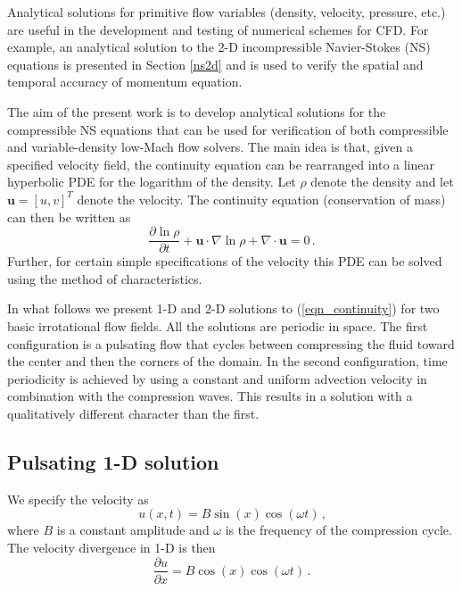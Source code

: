 \documentclass[11pt]{book}
\begin{document}
Analytical solutions for primitive flow variables (density, velocity, pressure, etc.) are useful in the development and testing of numerical schemes for CFD.  For example, an analytical solution to the 2-D incompressible Navier-Stokes (NS) equations is presented in Section \ref{ns2d} and is used to verify the spatial and temporal accuracy of momentum equation.

The aim of the present work is to develop analytical solutions for the compressible NS equations that can be used for verification of both compressible and variable-density low-Mach flow solvers.  The main idea is that, given a specified velocity field, the continuity equation can be rearranged into a linear hyperbolic PDE for the logarithm of the density.  Let $\rho$ denote the density and let $\mathbf{u} = [u,v]^T$ denote the velocity. The continuity equation (conservation of mass) can then be written as
\begin{equation}
\label{eqn_continuity}
\frac{\partial \ln \rho}{\partial t} + \mathbf{u} \cdot \nabla \ln \rho + \nabla\cdot \mathbf{u} = 0 \,\mbox{.}
\end{equation}
Further, for certain simple specifications of the velocity this PDE can be solved using the method of characteristics.

In what follows we present 1-D and 2-D solutions to (\ref{eqn_continuity}) for two basic irrotational flow fields.  All the solutions are periodic in space.  The first configuration is a pulsating flow that cycles between compressing the fluid toward the center and then the corners of the domain.  In the second configuration, time periodicity is achieved by using a constant and uniform advection velocity in combination with the compression waves.  This results in a solution with a qualitatively different character than the first.

\subsection{Pulsating 1-D solution}
\label{soln_1d}

We specify the velocity as
\begin{equation}
\label{eqn_velocity1d}
u(x,t)  = B \sin(x) \cos(\omega t) \,\mbox{,}
\end{equation}
where $B$ is a constant amplitude and $\omega$ is the frequency of the compression cycle. The velocity divergence in 1-D is then
\begin{equation}
\label{eqn_pdesource1d}
\frac{\partial u}{\partial x} = B \cos(x) \cos(\omega t) \,\mbox{.}
\end{equation}
\end{document}

